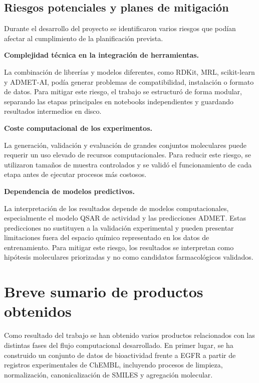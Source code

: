 \documentclass[IB]{TFUOC}%
\begin{document}
\subsection{Riesgos potenciales y planes de mitigación}

Durante el desarrollo del proyecto se identificaron varios riesgos que podían afectar al cumplimiento de la planificación prevista.

\medskip
\textbf{Complejidad técnica en la integración de herramientas.}
\smallskip

La combinación de librerías y modelos diferentes, como RDKit, MRL, scikit-learn y ADMET-AI, podía generar problemas de compatibilidad, instalación o formato de datos. Para mitigar este riesgo, el trabajo se estructuró de forma modular, separando las etapas principales en notebooks independientes y guardando resultados intermedios en disco.

\medskip
\textbf{Coste computacional de los experimentos.}
\smallskip

La generación, validación y evaluación de grandes conjuntos moleculares puede requerir un uso elevado de recursos computacionales. Para reducir este riesgo, se utilizaron tamaños de muestra controlados y se validó el funcionamiento de cada etapa antes de ejecutar procesos más costosos.

\medskip
\textbf{Dependencia de modelos predictivos.}
\smallskip

La interpretación de los resultados depende de modelos computacionales, especialmente el modelo QSAR de actividad y las predicciones ADMET. Estas predicciones no sustituyen a la validación experimental y pueden presentar limitaciones fuera del espacio químico representado en los datos de entrenamiento. Para mitigar este riesgo, los resultados se interpretan como hipótesis moleculares priorizadas y no como candidatos farmacológicos validados.


\section{Breve sumario de productos obtenidos}

Como resultado del trabajo se han obtenido varios productos relacionados con las distintas fases del flujo computacional desarrollado. En primer lugar, se ha construido un conjunto de datos de bioactividad frente a EGFR a partir de registros experimentales de ChEMBL, incluyendo procesos de limpieza, normalización, canonicalización de SMILES y agregación molecular.
\end{document}

